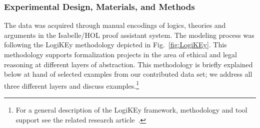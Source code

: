 \documentclass{article}
\newcommand{\comment}[1]{
}
\begin{document}
\comment{
[Describe your data and remember to refer to each data file (i.e., figure 1, figure 2, table 1, dataset, raw data, supplemental data, etc.) that are included in this article. Please provide a clear description of each file – do not simply list them. No insight, interpretation, background or conclusions should be included in this section. Min word 150, no maximum]
}

\subsubsection*{Experimental Design, Materials, and Methods}

The data was acquired through manual encodings of logics, theories and
arguments in the
Isabelle/HOL \cite{Isabelle} proof assistant system. The modeling
process was following the LogiKEy methodology depicted in
Fig.~\ref{fig:LogiKEy}. This methodology supports formalization
projects in the area of ethical and legal reasoning at different
layers of abstraction. This methodology is briefly explained below at hand of
selected examples from our contributed data set; we address all three
different layers and discuss examples.\footnote{For a general
description of the LogiKEy framework, methodology and tool support see
the related research article~\cite{J48}.}
\end{document}
